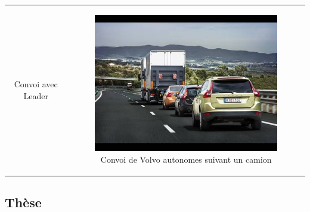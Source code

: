 \documentclass{beamer}
\begin{document}
\begin{frame}
  \begin{tabular}{c c}
    \begin{minipage}{0.5\linewidth}
      Convoi avec Leader
    \end{minipage}
    &
    \begin{minipage}{0.5\linewidth}
      \begin{figure}
        \includegraphics[width=1.0\linewidth]{images/ConvoiVolvo.jpg}
        \caption{Convoi de Volvo autonomes suivant un camion}
      \end{figure}
    \end{minipage}
  \end{tabular}
\end{frame}

\subsection*{Thèse}
\end{document}
